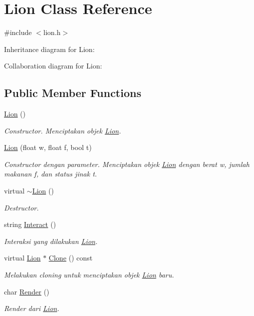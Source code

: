 \hypertarget{classLion}{}\section{Lion Class Reference}
\label{classLion}


{\ttfamily \#include $<$lion.\+h$>$}



Inheritance diagram for Lion\+:


Collaboration diagram for Lion\+:
\subsection*{Public Member Functions}
\begin{DoxyCompactItemize}
\item 
\hyperlink{classLion_a582202364024a9ce10e57f47c872dbc2}{Lion} ()
\begin{DoxyCompactList}\small\item\em Constructor. Menciptakan objek \hyperlink{classLion}{Lion}. \end{DoxyCompactList}\item 
\hyperlink{classLion_a5bc46f23f72bc31fe8ef58db40a62b58}{Lion} (float w, float f, bool t)
\begin{DoxyCompactList}\small\item\em Constructor dengan parameter. Menciptakan objek \hyperlink{classLion}{Lion} dengan berat w, jumlah makanan f, dan status jinak t. \end{DoxyCompactList}\item 
virtual \hyperlink{classLion_a09c9c113e6ca2d7c7b304b009d61dc62}{$\sim$\+Lion} ()
\begin{DoxyCompactList}\small\item\em Destructor. \end{DoxyCompactList}\item 
string \hyperlink{classLion_a4c090a9b5f42b92c30d223b40435e167}{Interact} ()
\begin{DoxyCompactList}\small\item\em Interaksi yang dilakukan \hyperlink{classLion}{Lion}. \end{DoxyCompactList}\item 
virtual \hyperlink{classLion}{Lion} $\ast$ \hyperlink{classLion_ae63405ef106650644a8fcafc7393284e}{Clone} () const 
\begin{DoxyCompactList}\small\item\em Melakukan cloning untuk menciptakan objek \hyperlink{classLion}{Lion} baru. \end{DoxyCompactList}\item 
char \hyperlink{classLion_ad782de7c88e4a7aad01287a2ed64827c}{Render} ()
\begin{DoxyCompactList}\small\item\em Render dari \hyperlink{classLion}{Lion}. \end{DoxyCompactList}\end{DoxyCompactItemize}
